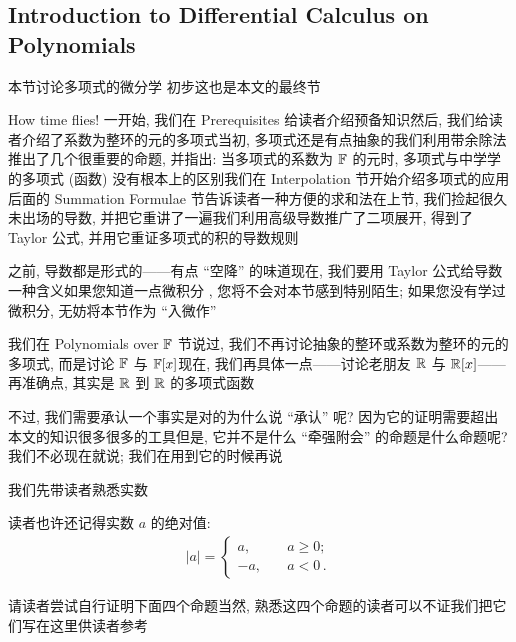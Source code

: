 \subsection*{Introduction to Differential Calculus on Polynomials}

本节讨论多项式的微分学  初步\period 这也是本文的最终节\period

How time flies! 一开始, 我们在 Prerequisites 给读者介绍预备知识\period 然后, 我们给读者介绍了系数为整环的元的多项式\period 当初, 多项式还是有点抽象的\period 我们利用带余除法推出了几个很重要的命题, 并指出: 当多项式的系数为 $\mathbb{F}$ 的元时, 多项式与中学学的多项式 (函数) 没有根本上的区别\period 我们在 Interpolation 节开始介绍多项式的应用\period 后面的 Summation Formulae 节告诉读者一种方便的求和法\period 在上节, 我们捡起很久未出场的导数, 并把它重讲了一遍\period 我们利用高级导数推广了二项展开, 得到了 Taylor 公式, 并用它重证多项式的积的导数规则\period

之前, 导数都是形式的——有点 ``空降'' 的味道\period 现在, 我们要用 Taylor 公式给导数一种含义\period 如果您知道一点微积分 , 您将不会对本节感到特别陌生; 如果您没有学过微积分, 无妨将本节作为 ``入微作''\period

我们在 Polynomials over $\mathbb{F}$ 节说过, 我们不再讨论抽象的整环或系数为整环的元的多项式, 而是讨论 $\mathbb{F}$ 与 $\mathbb{F}[x]$\period 现在, 我们再具体一点——讨论老朋友 $\mathbb{R}$ 与 $\mathbb{R}[x]$——再准确点, 其实是 $\mathbb{R}$ 到 $\mathbb{R}$ 的多项式函数\period

不过, 我们需要承认一个事实是对的\period 为什么说 ``承认'' 呢? 因为它的证明需要超出本文的知识很多很多的工具\period 但是, 它并不是什么 ``牵强附会'' 的命题\period 是什么命题呢? 我们不必现在就说; 我们在用到它的时候再说\period

我们先带读者熟悉实数\period

读者也许还记得实数 $a$ 的绝对值:
\begin{align*}
    |a| = \begin{cases}
        a,  & \quad a \geq 0;     \\
        -a, & \quad a < 0 \period
    \end{cases}
\end{align*}

请读者尝试自行证明下面四个命题\period 当然, 熟悉这四个命题的读者可以不证\period 我们把它们写在这里供读者参考\period

